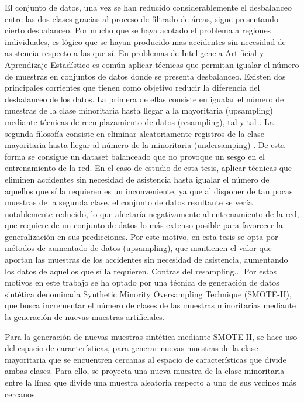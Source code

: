 \documentclass{uathesis-es}
\begin{document}
El conjunto de datos, una vez se han reducido considerablemente el desbalanceo entre las dos clases gracias al proceso de filtrado de áreas, sigue presentando cierto desbalanceo. Por mucho que se haya acotado el problema a regiones individuales, es lógico que se hayan producido mas accidentes sin necesidad de asistencia respecto a las que sí. En problemas de Inteligencia Artificial y Aprendizaje Estadístico es común aplicar técnicas que permitan igualar el número de muestras en conjuntos de datos donde se presenta desbalanceo. Existen dos principales corrientes que tienen como objetivo reducir la diferencia del desbalanceo de los datos. La primera de ellas consiste en igualar el número de muestras de la clase minoritaria hasta llegar a la mayoritaria (upsampling) mediante técnicas de reemplazamiento de datos (resampling), tal y tal . La segunda filosofía consiste en eliminar aleatoriamente registros de la clase mayoritaria hasta llegar al número de la minoritaria (undersamping) \cite{mohammed2020machine}. De esta forma se consigue un dataset balanceado que no provoque un sesgo en el entrenamiento de la red. En el caso de estudio de esta tesis, aplicar técnicas que eliminen accidentes sin necesidad de asistencia hasta igualar el número de aquellos que sí la requieren es un inconveniente, ya que al disponer de tan pocas muestras de la segunda clase, el conjunto de datos resultante se vería notablemente reducido, lo que afectaría negativamente al entrenamiento de la red, que requiere de un conjunto de datos lo más extenso posible para favorecer la generalización en sus predicciones. Por este motivo, en esta tesis se opta por métodos de aumentado de datos (upsampling), que mantienen el valor que aportan las muestras de los accidentes sin necesidad de asistencia, aumentando los datos de aquellos que sí la requieren. Contras del resampling... Por estos motivos en este trabajo se ha optado por una técnica de generación de datos sintética denominada Synthetic Minority Oversampling Technique (SMOTE-II), que busca incrementar el número de clases de las muestras minoritarias mediante la generación de nuevas muestras artificiales.

Para la generación de nuevas muestras sintética mediante SMOTE-II, se hace uso del espacio de características, para generar nuevas muestras de la clase mayoritaria que se encuentren cercanas al espacio de características que divide ambas clases. Para ello, se proyecta una nueva muestra de la clase minoritaria entre la línea que divide una muestra aleatoria respecto a uno de sus vecinos más cercanos.
\end{document}
